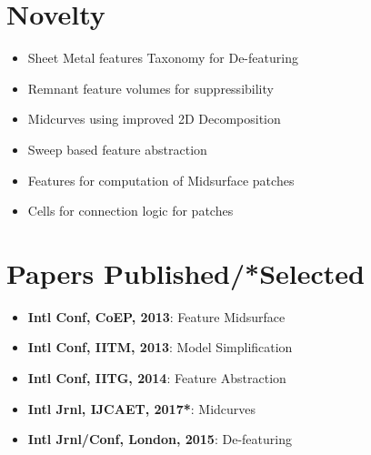 %		
%			
%			
\vspace{-1em}

		
\section{Novelty}

\begin{itemize}[noitemsep,nolistsep]

	\item Sheet Metal features Taxonomy for De-featuring
	\item Remnant feature volumes for suppressibility
	\item Midcurves using improved 2D Decomposition
	\item Sweep based feature abstraction
	\item Features for computation of Midsurface patches
	\item Cells for connection logic for patches
	
\end{itemize} 
		

\section{Papers Published/*Selected}

\begin{itemize}[noitemsep,nolistsep]

	\item \textbf{Intl Conf, CoEP, 2013}: Feature Midsurface
	\item \textbf{Intl Conf, IITM, 2013}:  Model Simplification
	\item \textbf{Intl Conf, IITG, 2014}:  Feature Abstraction
	\item \textbf{Intl Jrnl, IJCAET, 2017*}: Midcurves
	\item \textbf{Intl Jrnl/Conf, London, 2015}: De-featuring
\end{itemize} 
%
%
